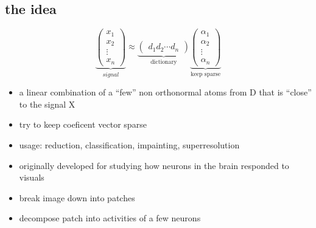 \subsection{the idea}
\begin{frame}
\[
\underbrace{\begin{pmatrix} x_1 \\ x_2 \\ \vdots \\ x_n \end{pmatrix}}_{signal} \approx \underbrace{\begin{pmatrix} d_1  d_2 \cdots d_n \end{pmatrix}}_{\textrm{dictionary}}
\underbrace{\begin{pmatrix} \alpha_1 \\ \alpha_2 \\ \vdots \\ \alpha_n \end{pmatrix}}_{\textrm{keep sparse}}
\]
\begin{itemize}
\item a linear combination of a “few” non orthonormal atoms from
D that is “close” to the signal X
\item try to keep coeficent vector sparse
\pause
\item usage: reduction, classification, impainting,  superresolution
\end{itemize}

\end{frame}

\begin{frame}
\begin{itemize}
\item originally developed for studying how neurons in the brain responded to visuals
\pause
\item break image down into patches
\pause
\item decompose patch into activities of a few neurons
\end{itemize}
\end{frame}

